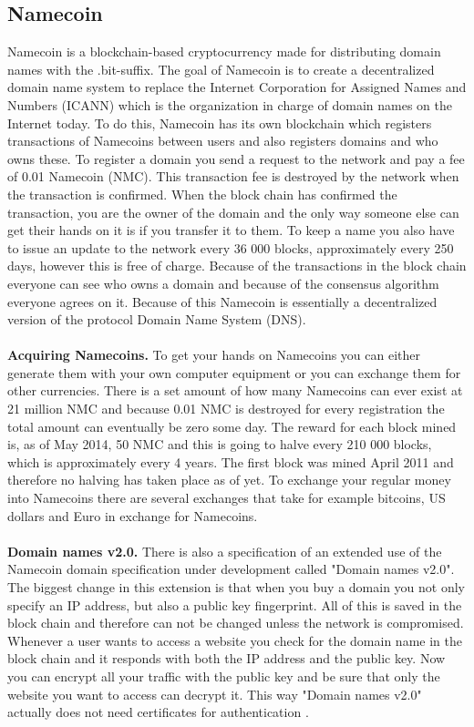 \documentclass[frame, english]{idamasterthesis}
\begin{document}
\hfill \cite{bitcoin}

\subsection{Namecoin}
Namecoin is a blockchain-based cryptocurrency made for distributing domain names with the .bit-suffix. The goal of Namecoin is to create a decentralized domain name system to replace the Internet Corporation for Assigned Names and Numbers (ICANN) which is the organization in charge of domain names on the Internet today. To do this, Namecoin has its own blockchain which registers transactions of Namecoins between users and also registers domains and who owns these. To register a domain you send a request to the network and pay a fee of 0.01 Namecoin (NMC). This transaction fee is destroyed by the network when the transaction is confirmed. When the block chain has confirmed the transaction, you are the owner of the domain and the only way someone else can get their hands on it is if you transfer it to them. To keep a name you also have to issue an update to the network every 36 000 blocks, approximately every 250 days, however this is free of charge. Because  of the transactions in the block chain everyone can see who owns a domain and because of the consensus algorithm everyone agrees on it. Because of this Namecoin is essentially a decentralized version of the protocol Domain Name System (DNS). \\\\
\textbf{Acquiring Namecoins.}
To get your hands on Namecoins you can either generate them with your own computer equipment or you can exchange them for other currencies. There is a set amount of how many Namecoins can ever exist at 21 million NMC and because 0.01 NMC is destroyed for every registration the total amount can eventually be zero some day. The reward for each block mined is, as of May 2014, 50 NMC and this is going to halve every 210 000 blocks, which is approximately every 4 years. The first block was mined April 2011 and therefore no halving has taken place as of yet. To exchange your regular money into Namecoins there are several exchanges that take for example bitcoins, US dollars and Euro in exchange for Namecoins. \\\\
\noindent
\textbf{Domain names v2.0.}
There is also a specification of an extended use of the Namecoin domain specification under development called "Domain names v2.0". The biggest change in this extension is that when you buy a domain you not only specify an IP address, but also a public key fingerprint. All of this is saved in the block chain and therefore can not be changed unless the network is compromised. Whenever a user wants to access a website you check for the domain name in the block chain and it responds with both the IP address and the public key. Now you can encrypt all your traffic with the public key and be sure that only the website you want to access can decrypt it. This way "Domain names v2.0" actually does not need certificates for authentication \cite{domain2}. \\\\
\end{document}
